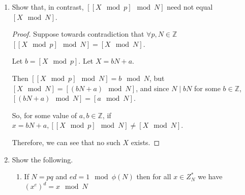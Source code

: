 \documentclass{article}
\begin{document}
\begin{enumerate}
    \begin{proof}
      Let $p, N \in \mathbb{Z}$ with $p \mid N$. By assumption $X \in \mathbb{Z}$.

      Consider $\left[\left[X \mod N\right] \mod p\right]$.

      Let $b = \left[X \mod N\right]$. Let $X = aN + b$ for any $a \in
      \mathbb{Z}$.

      Then, $\left[\left[X \mod N\right] \mod p\right] = \left[b \mod p\right]$.

      Then, consider $\left[X \mod p\right]$.

      Now, $\left[X \mod p\right] = \left[(aN + b) \mod p\right]$.

      Since $p \mid N, p \mid aN$ for some $a \in \mathbb{Z}$.

      So, $\left[x \mod p\right] = \left[(aN + b) \mod p\right] = \left[b \mod
      p\right]$.

      Since $\left[\left[X \mod N\right] \mod p\right] = \left[b \mod p\right]$
      and $\left[X \mod p\right] = \left[b \mod p\right]$, $\left[\left[X \mod
      N\right] \mod p\right] = \left[X \mod p\right]$
    \end{proof}

  \item Show that, in contrast, $[[X \mod p ] \mod N ]$ need not equal $[X \mod N
    ]$.

    \begin{proof}
      Suppose towards contradiction that $\forall p, N \in \mathbb{Z}$
      $\left[\left[X \mod p\right] \mod N\right] = \left[X \mod N\right]$.

      Let $b = \left[X \mod p\right]$. Let $X = bN + a$.

      Then $\left[\left[X \mod p\right] \mod N\right] = b \mod N$, but $\left[X
      \mod N\right] = \left[(bN + a) \mod N\right]$, and since $N \mid bN$ for
      some $b \in \mathbb{Z}$, $\left[(bN + a) \mod N\right] = \left[a \mod
      N\right]$.

      So, for some value of $a, b \in \mathbb{Z}$, if $x = bN + a, \left[\left[X
      \mod p\right] \mod N\right] \neq \left[X \mod N\right]$.

      Therefore, we can see that no such $X$ exists.
    \end{proof}

  \item Show the following.
    \begin{enumerate}
      \item If $N = pq$ and $ed = 1 \mod \phi(N)$ then for all $x \in Z^{*}_N$ 
        we have $(x^e)^d = x \mod N$


\end{enumerate}
\end{enumerate}
\end{document}
